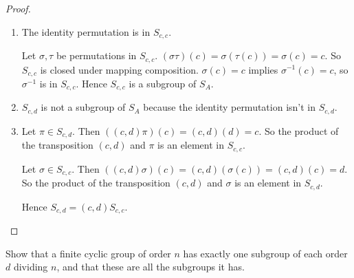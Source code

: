 \begin{proof}
    \begin{enumerate}[label={\textbf{\alph*.}}]
        \item The identity permutation is in $S_{c,c}$.

              Let $\sigma,\tau$ be permutations in $S_{c,c}$. $(\sigma\tau)(c) = \sigma(\tau(c)) = \sigma(c) = c$. So $S_{c,c}$ is closed under mapping composition. $\sigma(c) = c$ implies $\sigma^{-1}(c) = c$, so $\sigma^{-1}$ is in $S_{c,c}$. Hence $S_{c,c}$ is a subgroup of $S_{A}$.
        \item $S_{c,d}$ is not a subgroup of $S_{A}$ because the identity permutation isn't in $S_{c,d}$.
        \item Let $\pi\in S_{c,d}$. Then $((c,d)\pi)(c) = (c,d)(d) = c$. So the product of the transposition $(c,d)$ and $\pi$ is an element in $S_{c,c}$.

            Let $\sigma\in S_{c,c}$. Then $((c,d)\sigma)(c) = (c,d)(\sigma(c)) = (c,d)(c) = d$. So the product of the transposition $(c,d)$ and $\sigma$ is an element in $S_{c,d}$.

            Hence $S_{c,d} = (c,d)S_{c,c}$.
    \end{enumerate}
\end{proof}

\newpage
\begin{exercise}
    Show that a finite cyclic group of order $n$ has exactly one subgroup of each order $d$ dividing $n$, and that these are all the subgroups it has.
\end{exercise}

